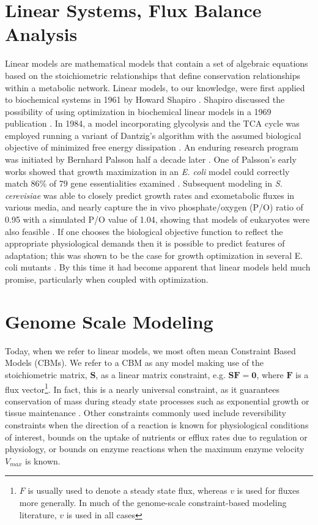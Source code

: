 \documentclass[phd,tocprelim]{cornell}
\begin{document}
\section{Linear Systems, Flux Balance Analysis}
Linear models are mathematical models that contain a set of algebraic
equations based on the stoichiometric relationships that define
conservation relationships within a metabolic network.  Linear models,
to our knowledge, were first applied to biochemical systems in 1961 by
Howard Shapiro \citep{Shapiro1961}. Shapiro discussed the possibility
of using optimization in biochemical linear models in a 1969
publication \citep{Shapiro1969}. In 1984, a model incorporating
glycolysis and the TCA cycle was employed running a variant of
Dantzig’s algorithm with the assumed biological objective of minimized
free energy dissipation \citep{Panne1985, Watson1984}. An enduring
research program was initiated by Bernhard Palsson half a decade later
\citep{Savinell1992a, Savinell1992}. One of Palsson's early works
showed that growth maximization in an \textit{E. coli} model could
correctly match 86\% of 79 gene essentialities examined
\citep{Edwards2000}. Subsequent modeling in \textit{S. cerevisiae} was
able to closely predict growth rates and exometabolic fluxes in
various media, and nearly capture the in vivo phosphate/oxygen (P/O)
ratio of 0.95 with a simulated P/O value of 1.04, showing that models
of eukaryotes were also feasible \citep{Famili2003}. If one chooses
the biological objective function to reflect the appropriate
physiological demands then it is possible to predict features of
adaptation; this was shown to be the case for growth optimization in
several E. coli mutants \citep{Fong2004_sb2013}. By this time it had
become apparent that linear models held much promise, particularly
when coupled with optimization.


\section{Genome Scale Modeling}
Today, when we refer to linear models, we most often mean Constraint
Based Models (CBMs). We refer to a CBM as any model making use of the
stoichiometric matrix, $\mathbf{S}$, as a linear matrix constraint, e.g. $\mathbf{SF} =
\mathbf{0}$, where $\mathbf{F}$ is a flux vector\footnote{$F$ is usually used to denote a
steady state flux, whereas $v$ is used for fluxes more generally. In
much of the genome-scale constraint-based modeling literature, $v$ is
used in all cases}. In fact, this is a nearly universal
constraint, as it guarantees conservation of mass during steady state
processes such as exponential growth or tissue maintenance \citep{Fleming2012}. 
Other constraints commonly used include reversibility constraints when the
direction of a reaction is known for physiological conditions of
interest, bounds on the uptake of nutrients or efflux rates due to
regulation or physiology, or bounds on enzyme reactions when the
maximum enzyme velocity $V_{max}$ is known.
\end{document}
